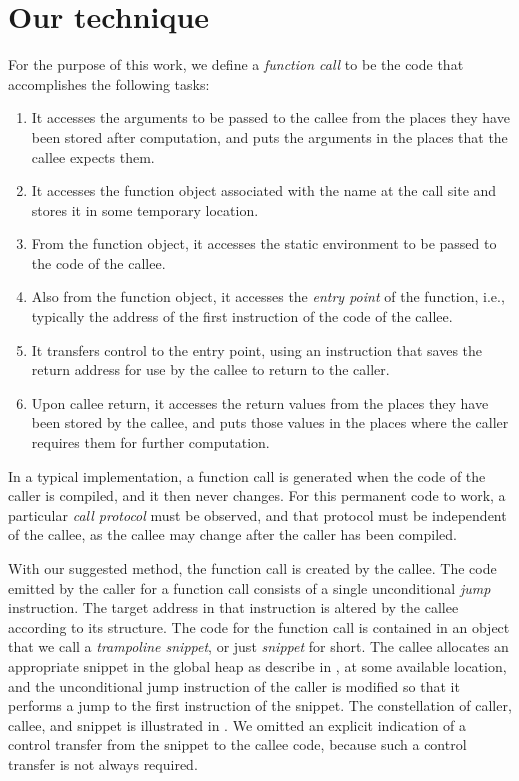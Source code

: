 \section{Our technique}
\label{sec-our-technique}

For the purpose of this work, we define a \emph{function call} to be
the code that accomplishes the following tasks:

\begin{enumerate}
\item It accesses the arguments to be passed to the callee from the
  places they have been stored after computation, and puts the
  arguments in the places that the callee expects them.
\item It accesses the function object associated with the name at the
  call site and stores it in some temporary location.
\item From the function object, it accesses the static environment to
  be passed to the code of the callee.
\item Also from the function object, it accesses the \emph{entry
  point} of the function, i.e., typically the address of the first
  instruction of the code of the callee.
\item It transfers control to the entry point, using an instruction
  that saves the return address for use by the callee to return to the
  caller.
\item Upon callee return, it accesses the return values from the places
  they have been stored by the callee, and puts those values in the
  places where the caller requires them for further computation.
\end{enumerate}

In a typical implementation, a function call is generated when the
code of the caller is compiled, and it then never changes.  For this
permanent code to work, a particular \emph{call protocol} must be
observed, and that protocol must be independent of the callee, as the
callee may change after the caller has been compiled.

With our suggested method, the function call is created by the callee.
The code emitted by the caller for a function call consists of a
single unconditional \emph{jump} instruction.  The target address in
that instruction is altered by the callee according to its structure.
The code for the function call is contained in an object that we call
a \emph{trampoline snippet}, or just \emph{snippet} for short.  The
callee allocates an appropriate snippet in the global heap as describe
in , at some available location, and the
unconditional jump instruction of the caller is modified so that it
performs a jump to the first instruction of the snippet.  The
constellation of caller, callee, and snippet is illustrated in
.  We omitted an explicit indication of a control
transfer from the snippet to the callee code, because such a control
transfer is not always required.

